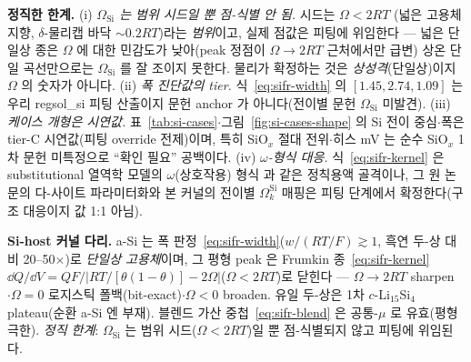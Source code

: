 \begin{warnbox}
\textbf{정직한 한계.} (i) \emph{$\Omega_\mathrm{Si}$ 는 범위 시드일 뿐 점-식별 안 됨.} 시드는 $\Omega<2RT$
(넓은 고용체 지향, $\delta$-물리캡 바닥 $\sim0.2RT$)라는 \emph{범위}이고, 실제 점값은 피팅에 위임한다 --- 넓은
단일상 종은 $\Omega$ 에 대한 민감도가 낮아(peak 정점이 $\Omega{\to}2RT$ 근처에서만 급변) 상온 단일 곡선만으로는
$\Omega_\mathrm{Si}$ 를 잘 조이지 못한다. 물리가 확정하는 것은 \emph{상성격}(단일상)이지 $\Omega$ 의 숫자가
아니다. (ii) \emph{폭 진단값의 tier.} 식~\eqref{eq:sifr-width} 의 $[1.45,2.74,1.09]$ 는 우리 regsol\_si 피팅
산출이지 문헌 anchor 가 아니다(전이별 문헌 $\Omega_\mathrm{Si}$ 미발견). (iii) \emph{케이스 개형은 시연값.}
표~\ref{tab:si-cases}$\cdot$그림~\ref{fig:si-cases-shape} 의 Si 전이 중심$\cdot$폭은 tier-C 시연값(피팅 override
전제)이며, 특히 SiO$_x$ 절대 전위$\cdot$히스 mV 는 순수 SiO$_x$ 1차 문헌 미특정으로 ``확인 필요'' 공백이다.
(iv) \emph{$\omega$-형식 대응.} 식~\eqref{eq:sifr-kernel} 은 substitutional 열역학 모델의 $\omega$(상호작용) 형식
\cite{verbrugge2017} 과 같은 정칙용액 골격이나, 그 원 논문의 다-사이트 파라미터화와 본 커널의 전이별
$\Omega_k^\mathrm{Si}$ 매핑은 피팅 단계에서 확정한다(구조 대응이지 값 1:1 아님).
\end{warnbox}

\begin{keybox}
\textbf{Si-host 커널 다리.} a-Si 는 폭 판정~\eqref{eq:sifr-width}($w/(RT/F)\gtrsim1$, 흑연 두-상 대비 20--50$\times$)로
\emph{단일상 고용체}이며, 그 평형 peak 은 Frumkin 종~\eqref{eq:sifr-kernel}
$\dd Q/\dd V=QF/|RT/[\theta(1-\theta)]-2\Omega|$($\Omega<2RT$)로 닫힌다 --- $\Omega{\to}2RT$ sharpen$\cdot\Omega{=}0$
로지스틱 폴백(bit-exact)$\cdot\Omega<0$ broaden. 유일 두-상은 1차 $c$-Li$_{15}$Si$_4$ plateau(순환 a-Si 엔 부재).
블렌드 가산 중첩~\eqref{eq:sifr-blend} 은 공통-$\mu$ 로 유효(평형 극한). \emph{정직 한계}: $\Omega_\mathrm{Si}$ 는
범위 시드($\Omega<2RT$)일 뿐 점-식별되지 않고 피팅에 위임된다.
\end{keybox}

